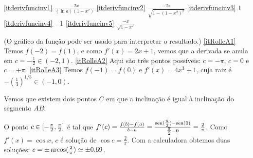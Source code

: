 \begin{Solution}{6.26}
\eqref{itderivfuncinv1} $\frac{-2x}{(\ln a)(1-x^2)}$
\eqref{itderivfuncinv2} $\frac{-2x}{\sqrt{1-(1-x^2)^2}}$
\eqref{itderivfuncinv3} $1$
\eqref{itderivfuncinv4} $-1$
\eqref{itderivfuncinv5} $\frac{-x}{\sqrt{1-x^2}}$
\end{Solution}
\begin{Solution}{6.28}
(O gráfico da função pode ser usado para interpretar o resultado.)
\eqref{itRolleA1} Temos $f(-2)=f(1)$, e como $f'(x)=2x+1$, vemos que a derivada
se anula em $c=-\frac{1}{2}\in (-2,1)$.
\eqref{itRolleA2} Aqui são três pontos possíveis: $c=-\pi$, $c=0$ e $c=+\pi$.
\eqref{itRolleA3} Temos $f(-1)=f(0)$ e $f'(x)=4x^3+1$, cuja raiz é
$-(\frac14)^{1/3}\in (-1,0)$.
\end{Solution}
\begin{Solution}{6.29}
Vemos que existem dois pontos $C$ em que a inclinação é igual à inclinação do
segmento $AB$:
\begin{center}
\begin{bmlimage}\end{bmlimage}
\end{center}
O ponto $c\in [-\tfrac{\pi}{2},\tfrac{\pi}{2}]$ é tal que
$f'(c)=\frac{f(b)-f(a)}{b-a}=\frac{\operatorname{sen}
(\tfrac{\pi}{2})-\operatorname{sen}(0)}{\tfrac{\pi}{2}-0}=\frac{2}{\pi}$. Como $f'(x)=\cos x$, $c$
é solução de $\cos c=\frac{2}{\pi}$. Com a calculadora obtemos duas
soluções: $c=\pm \operatorname{arcos}(\frac{2}{\pi})\simeq \pm 0.69$.
\end{Solution}
